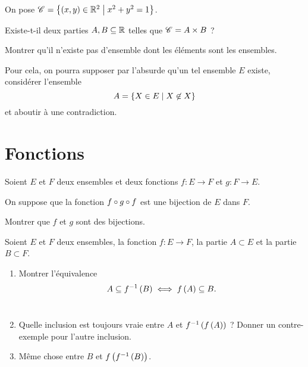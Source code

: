 \begin{corr}
\end{corr}

\begin{exo}
On pose \(\mathscr{C}^{}=\left\lbrace\left(x,y\right)\in\mathbb{R}^2\;\middle|\; x^2+y^2=1\right\rbrace\).

Existe-t-il deux parties \(A,B\subseteq\mathbb{R}\) telles que \(\mathscr{C}^{}=A\times B\) ?
\end{exo}

\begin{corr}
\end{corr}

\begin{exo}
Montrer qu'il n'existe pas d'ensemble dont les éléments sont les ensembles.

Pour cela, on pourra supposer par l'absurde qu'un tel ensemble \(E\) existe, considérer l'ensemble \[A=\left\lbrace X\in E\;\middle|\; X\not\in X\right\rbrace\] et aboutir à une contradiction.
\end{exo}

\begin{corr}
\end{corr}

\section{Fonctions}

\begin{exo}
Soient \(E\) et \(F\) deux ensembles et deux fonctions \(f:E\to F\) et \(g:F\to E\).

On suppose que la fonction \(f\circ g\circ f\) est une bijection de \(E\) dans \(F\).

Montrer que \(f\) et \(g\) sont des bijections.
\end{exo}

\begin{corr}
\end{corr}

\begin{exo}
Soient \(E\) et \(F\) deux ensembles, la fonction \(f:E\to F\), la partie \(A\subset E\) et la partie \(B\subset F\).

\begin{enumerate}
\item Montrer l'équivalence \[A\subseteq f^{-1}\left(B\right)\iff f\left(A\right)\subseteq B.\] \\

\item Quelle inclusion est toujours vraie entre \(A\) et \(f^{-1}\left(f\left(A\right)\right)\) ? Donner un contre-exemple pour l'autre inclusion. \\

\item Même chose entre \(B\) et \(f\left(f^{-1}\left(B\right)\right)\).
\end{enumerate}
\end{exo}

